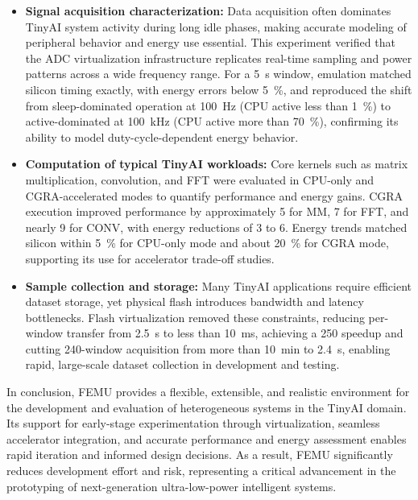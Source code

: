         \vspace{-1em}
        \begin{itemize}
            \item \textbf{Signal acquisition characterization:} Data acquisition often dominates TinyAI system activity during long idle phases, making accurate modeling of peripheral behavior and energy use essential. This experiment verified that the ADC virtualization infrastructure replicates real-time sampling and power patterns across a wide frequency range. For a \SI{5}{\second} window, emulation matched silicon timing exactly, with energy errors below \SI{5}{\percent}, and reproduced the shift from sleep-dominated operation at \SI{100}{\hertz} (CPU active less than \SI{1}{\percent}) to active-dominated at \SI{100}{\kilo\hertz} (CPU active more than \SI{70}{\percent}), confirming its ability to model duty-cycle-dependent energy behavior.
        
            \item \textbf{Computation of typical TinyAI workloads:} Core kernels such as matrix multiplication, convolution, and FFT were evaluated in CPU-only and CGRA-accelerated modes to quantify performance and energy gains. CGRA execution improved performance by approximately \SI{5}{\times} for MM, \SI{7}{\times} for FFT, and nearly \SI{9}{\times} for CONV, with energy reductions of \SI{3}{\times} to \SI{6}{\times}. Energy trends matched silicon within \SI{5}{\percent} for CPU-only mode and about \SI{20}{\percent} for CGRA mode, supporting its use for accelerator trade-off studies.
        
            \item \textbf{Sample collection and storage:} Many TinyAI applications require efficient dataset storage, yet physical flash introduces bandwidth and latency bottlenecks. Flash virtualization removed these constraints, reducing per-window transfer from \SI{2.5}{\second} to less than \SI{10}{\milli\second}, achieving a \SI{250}{\times} speedup and cutting 240-window acquisition from more than \SI{10}{\minute} to \SI{2.4}{\second}, enabling rapid, large-scale dataset collection in development and testing.
        \end{itemize}
        \vspace{-1em}
 
        In conclusion, \mbox{FEMU} provides a flexible, extensible, and realistic environment for the development and evaluation of heterogeneous systems in the TinyAI domain. Its support for early-stage experimentation through virtualization, seamless accelerator integration, and accurate performance and energy assessment enables rapid iteration and informed design decisions. As a result, \mbox{FEMU} significantly reduces development effort and risk, representing a critical advancement in the prototyping of next-generation ultra-low-power intelligent systems.
